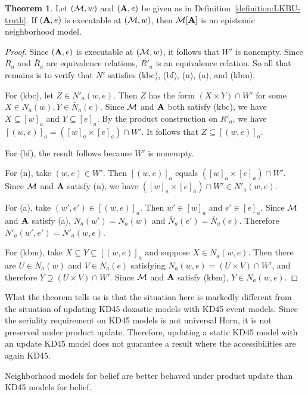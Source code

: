 \documentclass[12pt]{article}
\theoremstyle{definition}
\newtheorem{theorem}{Theorem}[section]
\newcommand{\M}{{\cal M}}      %
\newcommand{\A}{{\bf A}}
\begin{document}
\begin{theorem}
  \label{theorem:well-defined}
  Let $(\M,w)$ and $(\A,e)$ be given as in
  Definition~\ref{definition:LKBU-truth}.  If $(\A,e)$ is executable
  at $(\M,w)$, then $\M[\A]$ is an epistemic neighborhood model.
\end{theorem}
\begin{proof}
  Since $(\A,e)$ is executable at $(\M,w)$, it follows that $W'$ is
  nonempty.  Since $R_a$ and $\bar{R}_a$ are equivalence relations,
  $R'_a$ is an equivalence relation.  So all that remains is to verify
  that $N'$ satisfies (kbc), (bf), (n), (a), and (kbm).

  For (kbc), let $Z \in N'_a(w,e)$. Then $Z$ has the form $(X \times Y)
  \cap W'$ for some $X \in N_a(w), Y \in \bar{N}_a(e)$. Since $\M$ and
  $\A$ both satisfy (kbc), we have $X \subseteq [w]_a$ and $Y \subseteq
  [e]_a$.  By the product construction on $R'_a$, we have $[(w,e)]_a =
  ([w]_a \times [e]_a) \cap W'$. It follows that $Z \subseteq
  [(w,e)]_a$.

  For (bf), the result follows because $W'$ is nonempty.

  For (n), take $(w,e) \in W'$. Then $[(w,e)]_a$ equals $([w]_a \times
  [e]_a) \cap W'$.  Since $\M$ and $\A$ satisfy (n), we have $([w]_a
  \times [e]_a) \cap W' \in N'_a(w,e)$.

  For (a), take $(w',e') \in [(w,e)]_a$. Then $w' \in [w]_a$ and $e'
  \in [e]_a$.  Since $\M$ and $\A$ satisfy (a), $N_a(w') = N_a(w)$ and
  $\bar{N}_a(e') = \bar{N}_a(e)$.  Therefore $N'_a (w',e') = N'_a
  (w,e)$.
 
  For (kbm), take $X \subseteq Y \subseteq [(w,e)]_a$ and suppose $X \in
  N_a(w,e)$. Then there are $U \in N_a(w)$ and $V \in N_a(e)$
  satisfying $N_a(w,e) = (U\times V) \cap W'$, and therefore $Y
  \supseteq (U\times V) \cap W'$. Since $\M$ and $\A$ satisfy (kbm), $Y
  \in N_a(w,e)$.
\end{proof}

What the theorem tells us is that the situation here is markedly
different from the situation of updating KD45 doxastic models with
KD45 event models. Since the seriality requirement on KD45 models is
not universal Horn, it is not preserved under product update.
Therefore, updating a static KD45 model with an update KD45 model does
not guarantee a result where the accessibilities are again KD45.

Neighborhood models for belief are better behaved under product update 
than KD45 models for belief. 
\end{document}
